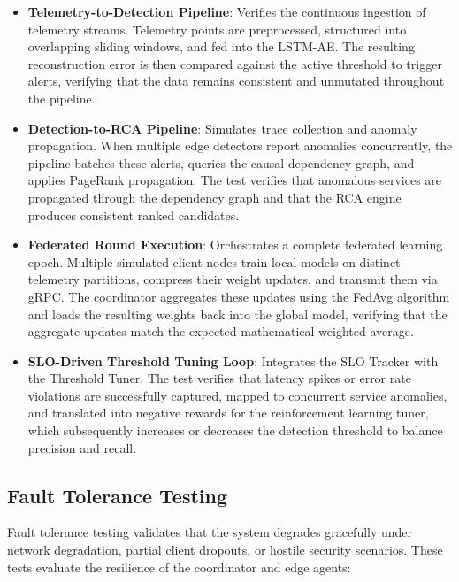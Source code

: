 \begin{itemize}
    \item \textbf{Telemetry-to-Detection Pipeline}: Verifies the continuous ingestion of telemetry streams. Telemetry points are preprocessed, structured into overlapping sliding windows, and fed into the LSTM-AE. The resulting reconstruction error is then compared against the active threshold to trigger alerts, verifying that the data remains consistent and unmutated throughout the pipeline.
    \item \textbf{Detection-to-RCA Pipeline}: Simulates trace collection and anomaly propagation. When multiple edge detectors report anomalies concurrently, the pipeline batches these alerts, queries the causal dependency graph, and applies PageRank propagation. The test verifies that anomalous services are propagated through the dependency graph and that the RCA engine produces consistent ranked candidates.
    \item \textbf{Federated Round Execution}: Orchestrates a complete federated learning epoch. Multiple simulated client nodes train local models on distinct telemetry partitions, compress their weight updates, and transmit them via gRPC. The coordinator aggregates these updates using the FedAvg algorithm and loads the resulting weights back into the global model, verifying that the aggregate updates match the expected mathematical weighted average.
    \item \textbf{SLO-Driven Threshold Tuning Loop}: Integrates the SLO Tracker with the Threshold Tuner. The test verifies that latency spikes or error rate violations are successfully captured, mapped to concurrent service anomalies, and translated into negative rewards for the reinforcement learning tuner, which subsequently increases or decreases the detection threshold to balance precision and recall.
\end{itemize}

\subsection{Fault Tolerance Testing}
\label{subsec:fault_tolerance_testing}

Fault tolerance testing validates that the system degrades gracefully under network degradation, partial client dropouts, or hostile security scenarios. These tests evaluate the resilience of the coordinator and edge agents:

